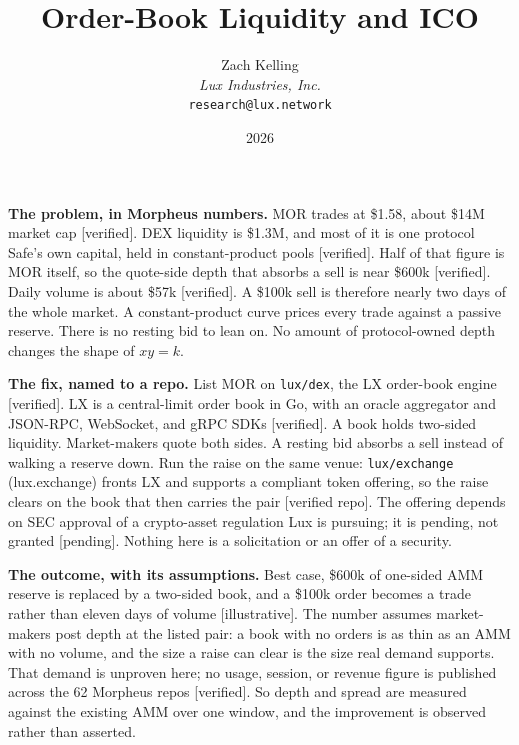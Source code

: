\documentclass[11pt,a4paper]{article}
\title{Order-Book Liquidity and ICO}
\author{Zach Kelling\\\textit{Lux Industries, Inc.}\\\texttt{research@lux.network}}
\date{2026}
\newcommand{\code}[1]{\texttt{\small #1}}
\begin{document}
\luxcoverpage
\sloppy

\par
\vspace{0.7ex}
\par
\vspace{0.7ex}
\noindent{\color{rule}\rule{\linewidth}{1.1pt}}\par
\vspace{1.2ex}

\noindent\textbf{The problem, in Morpheus numbers.}
MOR trades at \$1.58, about \$14M market cap [verified]. DEX liquidity is \$1.3M, and most of it
is one protocol Safe's own capital, held in constant-product pools [verified]. Half of that figure
is MOR itself, so the quote-side depth that absorbs a sell is near \$600k [verified]. Daily volume
is about \$57k [verified]. A \$100k sell is therefore nearly two days of the whole market. A constant-product
curve prices every trade against a passive reserve. There is no resting bid to lean on. No amount of
protocol-owned depth changes the shape of $xy=k$.

\noindent\textbf{The fix, named to a repo.}
List MOR on \code{lux/dex}, the LX order-book engine [verified]. LX is a central-limit order book in
Go, with an oracle aggregator and JSON-RPC, WebSocket, and gRPC SDKs [verified]. A book holds
two-sided liquidity. Market-makers quote both sides. A resting bid absorbs a sell instead of walking
a reserve down. Run the raise on the same venue: \code{lux/exchange} (lux.exchange) fronts LX and
supports a compliant token offering, so the raise clears on the book that then carries the pair
[verified repo]. The offering depends on SEC approval of a crypto-asset regulation Lux is pursuing;
it is pending, not granted [pending]. Nothing here is a solicitation or an offer of a security.

\noindent\textbf{The outcome, with its assumptions.}
Best case, \$600k of one-sided AMM reserve is replaced by a two-sided book, and a \$100k order
becomes a trade rather than eleven days of volume [illustrative]. The number assumes market-makers
post depth at the listed pair: a book with no orders is as thin as an AMM with no volume, and the
size a raise can clear is the size real demand supports. That demand is unproven here; no usage,
session, or revenue figure is published across the 62 Morpheus repos [verified]. So depth and spread
are measured against the existing AMM over one window, and the improvement is observed rather than
asserted.
\end{document}
